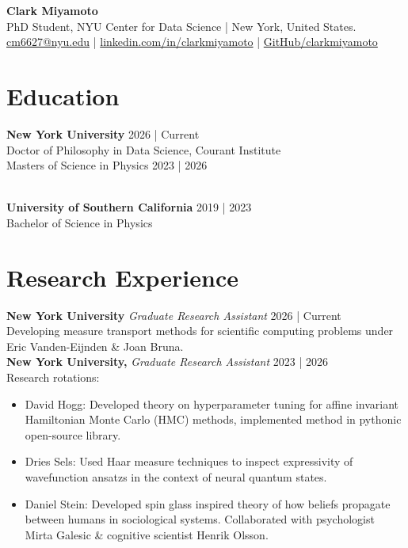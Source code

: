 \documentclass[a4paper,9pt]{extarticle}
\begin{document}
\pagestyle{fancy}
\renewcommand{\headrulewidth}{0pt}
\fancyhead{}
\thispagestyle{empty} %

\begin{flushleft}
\textbf{\LARGE Clark Miyamoto}\\[2pt] %
PhD Student, NYU Center for Data Science | New York, United States.
\\ \href{mailto:cm6627@nyu.edu}{cm6627@nyu.edu} | \href{https://www.linkedin.com/in/clarkmiyamoto}{linkedin.com/in/clarkmiyamoto} | \href{https://github.com/clarkmiyamoto}{GitHub/clarkmiyamoto} %
\end{flushleft}

\section*{Education}
\noindent
\textbf{New York University} \hfill 2026 | Current\\
Doctor of Philosophy in Data Science, Courant Institute %
\\
\noindent
Masters of Science in Physics \hfill 2023 | 2026

\noindent\\
\textbf{University of Southern California} \hfill 2019 |  2023\\
Bachelor of Science in Physics 

\section*{Research Experience}
\noindent
\textbf{New York University} \textit{Graduate Research Assistant} \hfill 2026 | Current\\
\noindent
Developing measure transport methods for scientific computing problems under Eric Vanden-Eijnden \& Joan Bruna.\\

\noindent
\textbf{New York University,} \textit{Graduate Research Assistant} \hfill 2023 | 2026\\
\noindent
Research rotations:
\begin{itemize}
    \item David Hogg: Developed theory on hyperparameter tuning for affine invariant Hamiltonian Monte Carlo (HMC) methods, implemented method in pythonic open-source library.
    \item Dries Sels: Used Haar measure techniques to inspect expressivity of wavefunction ansatzs in the context of neural quantum states.
    \item Daniel Stein: Developed spin glass inspired theory of how beliefs propagate between humans in sociological systems. Collaborated with psychologist Mirta Galesic \& cognitive scientist Henrik Olsson.
\end{itemize}
\end{document}
